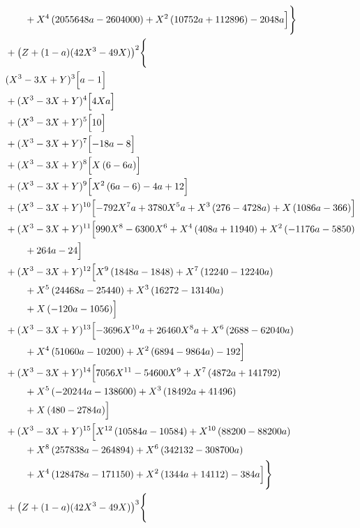\begin{align*}
&\qquad + X^{4} \left(2055648 a - 2604000\right) + X^{2} \left(10752 a + 112896\right) - 2048 a\Bigr]\Biggr\}\\
&{}+\bigl(Z+(1-a)(42X^3-49X)\bigr)^{2}\Biggl\{\\
&{}(X^3-3X+Y)^{3}\Bigl[a - 1\Bigr]\\
&{}+(X^3-3X+Y)^{4}\Bigl[4 X a\Bigr]\\
&{}+(X^3-3X+Y)^{5}\Bigl[10\Bigr]\\
&{}+(X^3-3X+Y)^{7}\Bigl[- 18 a - 8\Bigr]\\
&{}+(X^3-3X+Y)^{8}\Bigl[X \left(6 - 6 a\right)\Bigr]\\
&{}+(X^3-3X+Y)^{9}\Bigl[X^{2} \left(6 a - 6\right) - 4 a + 12\Bigr]\\
&{}+(X^3-3X+Y)^{10}\Bigl[- 792 X^{7} a + 3780 X^{5} a + X^{3} \left(276 - 4728 a\right) + X \left(1086 a - 366\right)\Bigr]\\
&{}+(X^3-3X+Y)^{11}\Bigl[990 X^{8} - 6300 X^{6} + X^{4} \left(408 a + 11940\right) + X^{2} \left(- 1176 a - 5850\right)\\
&\qquad + 264 a - 24\Bigr]\\
&{}+(X^3-3X+Y)^{12}\Bigl[X^{9} \left(1848 a - 1848\right) + X^{7} \left(12240 - 12240 a\right)\\
&\qquad + X^{5} \left(24468 a - 25440\right) + X^{3} \left(16272 - 13140 a\right)\\
&\qquad + X \left(- 120 a - 1056\right)\Bigr]\\
&{}+(X^3-3X+Y)^{13}\Bigl[- 3696 X^{10} a + 26460 X^{8} a + X^{6} \left(2688 - 62040 a\right)\\
&\qquad + X^{4} \left(51060 a - 10200\right) + X^{2} \left(6894 - 9864 a\right) - 192\Bigr]\\
&{}+(X^3-3X+Y)^{14}\Bigl[7056 X^{11} - 54600 X^{9} + X^{7} \left(4872 a + 141792\right)\\
&\qquad + X^{5} \left(- 20244 a - 138600\right) + X^{3} \left(18492 a + 41496\right)\\
&\qquad + X \left(480 - 2784 a\right)\Bigr]\\
&{}+(X^3-3X+Y)^{15}\Bigl[X^{12} \left(10584 a - 10584\right) + X^{10} \left(88200 - 88200 a\right)\\
&\qquad + X^{8} \left(257838 a - 264894\right) + X^{6} \left(342132 - 308700 a\right)\\
&\qquad + X^{4} \left(128478 a - 171150\right) + X^{2} \left(1344 a + 14112\right) - 384 a\Bigr]\Biggr\}\\
&{}+\bigl(Z+(1-a)(42X^3-49X)\bigr)^{3}\Biggl\{\\

\end{align*}
